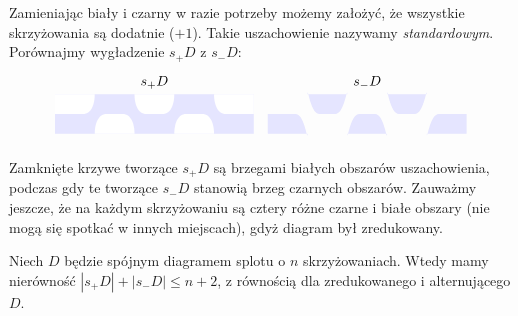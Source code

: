 Zamieniając biały i czarny w razie potrzeby możemy założyć, że wszystkie skrzyżowania są dodatnie ($+1$).
Takie uszachowienie nazywamy \emph{standardowym}.
Porównajmy wygładzenie $s_+D$ z $s_-D$:
\[
    \begin{tikzpicture}[baseline=-0.65ex,scale=0.10]
        \node at (0, 8) {$s_+D$};
        \draw[fill=blue!10!white,draw=none] (-25, -5) rectangle (25, 5);
        \draw[fill=white, draw=none] (-15, -5) [in=left, out=up] to (-12, 0) -- (-8, 0) [in=up, out=right] to (-5, -5);
        \draw[fill=white, draw=none] (5, -5) [in=left, out=up] to (8, 0) -- (12, 0) [in=up, out=right] to (15, -5);
        \draw[fill=white, draw=none] (-5, 5) [in=left, out=down] to (-2, 0) -- (2, 0) [in=down, out=right] to (5, 5);
        \draw[fill=white, draw=none] (-25, 0) -- (-18, 0) [in=down, out=right] to (-15, 5) -- (-25, 5);
        \draw[fill=white, draw=none] ( 25, 0) -- ( 18, 0) [in=down, out=left] to ( 15, 5) -- ( 25, 5);
    \end{tikzpicture}
    \quad
    \begin{tikzpicture}[baseline=-0.65ex,scale=0.10]
        \node at (0, 8) {$s_-D$};
        \draw[fill=blue!10!white, draw=none] (-15, 5) [in=left, out=up] to (-12, 0) -- (-8, 0) [in=up, out=right] to (-5, 5);
        \draw[fill=blue!10!white, draw=none] (5, 5) [in=left, out=up] to (8, 0) -- (12, 0) [in=up, out=right] to (15, 5);
        \draw[fill=blue!10!white, draw=none] (-5, -5) [in=left, out=down] to (-2, 0) -- (2, 0) [in=down, out=right] to (5, -5);
        \draw[fill=blue!10!white, draw=none] (-25, 0) -- (-18, 0) [in=down, out=right] to (-15, -5) -- (-25, -5);
        \draw[fill=blue!10!white, draw=none] ( 25, 0) -- ( 18, 0) [in=down, out=left] to ( 15, -5) -- ( 25, -5);
    \end{tikzpicture}
\]

Zamknięte krzywe tworzące $s_+D$ są brzegami białych obszarów uszachowienia,
podczas gdy te tworzące $s_-D$ stanowią brzeg czarnych obszarów.
Zauważmy jeszcze, że na każdym skrzyżowaniu są cztery różne czarne i białe obszary
(nie mogą się spotkać w innych miejscach), gdyż diagram był zredukowany.

\begin{lemma}
Niech $D$ będzie spójnym diagramem splotu o $n$ skrzyżowaniach.
Wtedy mamy nierówność $|s_+D|+|s_-D|\le n+2$, z równością dla zredukowanego i alternującego $D$.
\end{lemma}

